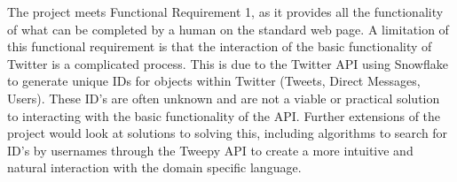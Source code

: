 The project meets Functional Requirement 1, as it provides all the functionality of what can be completed by a human on the standard web page. A limitation of this functional requirement is that the interaction of the basic functionality of Twitter is a complicated process. This is due to the Twitter API using Snowflake to generate unique IDs for objects within Twitter (Tweets, Direct Messages, Users). These ID's are often unknown and are not a viable or practical solution to interacting with the basic functionality of the API. Further extensions of the project would look at solutions to solving this, including algorithms to search for ID's by usernames through the Tweepy API to create a more intuitive and natural interaction with the domain specific language.